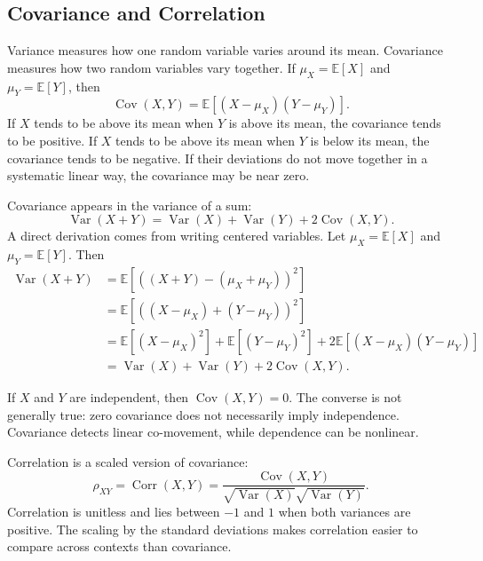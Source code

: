 {\subsection{Covariance and Correlation}

Variance measures how one random variable varies around its mean.  Covariance measures how two random variables vary together.  If $\mu_X=\mathbb{E}[X]$ and $\mu_Y=\mathbb{E}[Y]$, then
\begin{equation}
  \operatorname{Cov}(X,Y)
  = \mathbb{E}\left[(X-\mu_X)(Y-\mu_Y)\right].
  \label{eq:covariance-definition}
\end{equation}
If $X$ tends to be above its mean when $Y$ is above its mean, the covariance tends to be positive.  If $X$ tends to be above its mean when $Y$ is below its mean, the covariance tends to be negative.  If their deviations do not move together in a systematic linear way, the covariance may be near zero.

Covariance appears in the variance of a sum:
\begin{equation}
  \operatorname{Var}(X+Y)
  = \operatorname{Var}(X)+\operatorname{Var}(Y)+2\operatorname{Cov}(X,Y).
  \label{eq:variance-sum}
\end{equation}
A direct derivation comes from writing centered variables.  Let $\mu_X=\mathbb{E}[X]$ and $\mu_Y=\mathbb{E}[Y]$.  Then
\begin{align*}
  \operatorname{Var}(X+Y)
  &= \mathbb{E}\left[\left((X+Y)-(\mu_X+\mu_Y)\right)^2\right] \\
  &= \mathbb{E}\left[\left((X-\mu_X)+(Y-\mu_Y)\right)^2\right] \\
  &= \mathbb{E}\left[(X-\mu_X)^2\right]
   + \mathbb{E}\left[(Y-\mu_Y)^2\right]
   + 2\mathbb{E}\left[(X-\mu_X)(Y-\mu_Y)\right] \\
  &= \operatorname{Var}(X)+\operatorname{Var}(Y)+2\operatorname{Cov}(X,Y).
\end{align*}

If $X$ and $Y$ are independent, then $\operatorname{Cov}(X,Y)=0$.  The converse is not generally true: zero covariance does not necessarily imply independence.  Covariance detects linear co-movement, while dependence can be nonlinear.

Correlation is a scaled version of covariance:
\begin{equation}
  \rho_{XY}
  = \operatorname{Corr}(X,Y)
  = \frac{\operatorname{Cov}(X,Y)}{\sqrt{\operatorname{Var}(X)}\sqrt{\operatorname{Var}(Y)}}.
  \label{eq:correlation-definition}
\end{equation}
Correlation is unitless and lies between $-1$ and $1$ when both variances are positive.  The scaling by the standard deviations makes correlation easier to compare across contexts than covariance.

}
